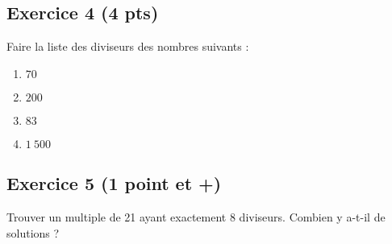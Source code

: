 \documentclass[14 pt]{extarticle}
\theoremstyle{plain}
\begin{document}
\subsection*{Exercice 4 (4 pts)}
Faire la liste des diviseurs des nombres suivants : 
\begin{enumerate}
\item $70$
\item $200$
\item $83$
\item $1~500$
\end{enumerate}

\subsection*{Exercice 5 (1 point et +)}

Trouver un multiple de 21 ayant exactement 8 diviseurs. Combien y a-t-il de solutions ?




 	
\end{document}

